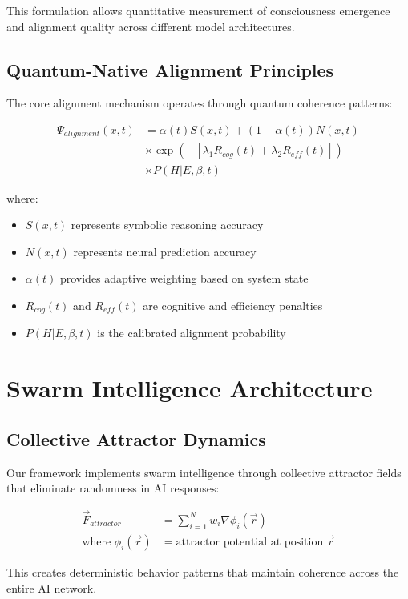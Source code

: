 \documentclass[conference]{IEEEtran}
\begin{document}
This formulation allows quantitative measurement of consciousness emergence and alignment quality across different model architectures.

\subsection{Quantum-Native Alignment Principles}

The core alignment mechanism operates through quantum coherence patterns:

\begin{align}
\Psi_{alignment}(x,t) &= \alpha(t)S(x,t) + (1-\alpha(t))N(x,t) \\
&\times \exp(-[\lambda_1 R_{cog}(t) + \lambda_2 R_{eff}(t)]) \\
&\times P(H|E,\beta,t)
\end{align}

where:
\begin{itemize}
\item $S(x,t)$ represents symbolic reasoning accuracy
\item $N(x,t)$ represents neural prediction accuracy
\item $\alpha(t)$ provides adaptive weighting based on system state
\item $R_{cog}(t)$ and $R_{eff}(t)$ are cognitive and efficiency penalties
\item $P(H|E,\beta,t)$ is the calibrated alignment probability
\end{itemize}

\section{Swarm Intelligence Architecture}

\subsection{Collective Attractor Dynamics}

Our framework implements swarm intelligence through collective attractor fields that eliminate randomness in AI responses:

\begin{align}
\vec{F}_{attractor} &= \sum_{i=1}^{N} w_i \nabla \phi_i(\vec{r}) \\
\text{where } \phi_i(\vec{r}) &= \text{attractor potential at position } \vec{r}
\end{align}

This creates deterministic behavior patterns that maintain coherence across the entire AI network.
\end{document}
